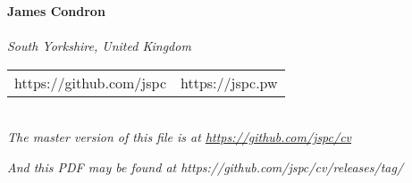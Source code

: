 \begin{center}
  {\huge\textbf{James Condron}}\\
  \textbf{\job} \\[\baselineskip]
  \textit{South Yorkshire, United Kingdom} \\

  \begin{tabular}{rl}
    https://github.com/jspc & https://jspc.pw \\
  \end{tabular} \\[\baselineskip]

  {\footnotesize\textit{The master version of this file is at \url{https://github.com/jspc/cv}}}

  {\footnotesize\textit{And this PDF may be found at https://github.com/jspc/cv/releases/tag/}}%
  {}

\end{center}

